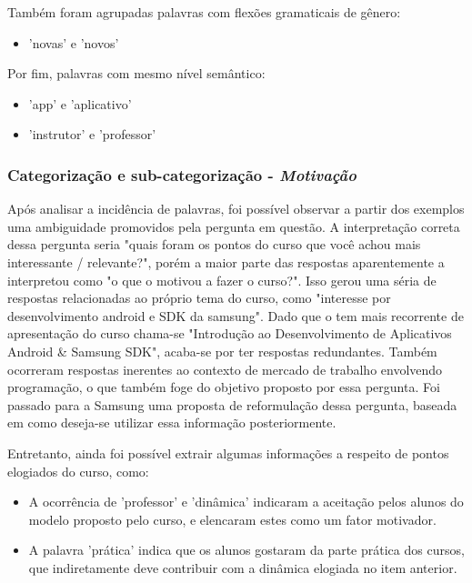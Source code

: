 Também foram agrupadas palavras com flexões gramaticais de gênero:

\begin{itemize}
\item 'novas' e 'novos'
\end{itemize}

Por fim, palavras com mesmo nível semântico:

\begin{itemize}
\item 'app' e 'aplicativo'
\item 'instrutor' e 'professor'
\end{itemize}



\subsubsection*{Categorização e sub-categorização - \textit{Motivação}}

Após analisar a incidência de palavras, foi possível observar a partir dos exemplos uma ambiguidade promovidos pela pergunta em questão. A interpretação correta dessa pergunta seria "quais foram os pontos do curso que você achou mais interessante / relevante?", porém a maior parte das respostas aparentemente a interpretou como "o que o motivou a fazer o curso?". Isso gerou uma séria de respostas relacionadas ao próprio tema do curso, como "interesse por desenvolvimento android e SDK da samsung". Dado que o tem mais recorrente de apresentação do curso chama-se "Introdução ao Desenvolvimento de Aplicativos Android \& Samsung SDK", acaba-se por ter respostas redundantes. Também ocorreram respostas inerentes ao contexto de mercado de trabalho envolvendo programação, o que também foge do objetivo proposto por essa pergunta. Foi passado para a Samsung uma proposta de reformulação dessa pergunta, baseada em como deseja-se utilizar essa informação posteriormente.

Entretanto, ainda foi possível extrair algumas informações a respeito de pontos elogiados do curso, como:

\begin{itemize}
\item A ocorrência de 'professor' e 'dinâmica' indicaram a aceitação pelos alunos do modelo proposto pelo curso, e elencaram estes como um fator motivador.
\item A palavra 'prática' indica que os alunos gostaram da parte prática dos cursos, que indiretamente deve contribuir com a dinâmica elogiada no item anterior.
\end{itemize}

